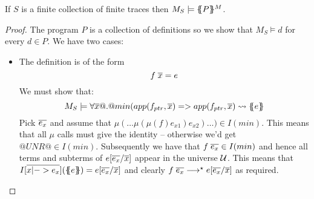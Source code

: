 \documentclass[preprint]{sigplanconf}
\begin{document}
\begin{theorem} If $S$ is a finite collection of finite traces then $M_S \models \{\!\!\{P\}\!\!\}^M$.
\end{theorem}
\begin{proof}
The program $P$ is a collection of definitions so we show that $M_S \models d$ for every $d \in P$. We have two
cases:
\begin{itemize}
  \item The definition is of the form 
                 \[ f\;\overline{x} = e \]
        We must show that:
        \[     M_S \models \forall \overline{x} @.@ min(app(f_{ptr},\overline{x}) => app(f_{ptr},\overline{x}) \rightsquigarrow \{\!\!\{{e}\}\!\!\} \]
        Pick $\overline{e_x}$ and assume that $\mu(\ldots\mu(\mu(f) e_{x1}) e_{x2})\ldots) \in I(min)$. This means that all
        $\mu$ calls must give the identity -- otherwise we'd get $@UNR@ \in I(min)$. Subsequently we have that
        $f\;\overline{e_x} \in I(min)$ and hence all terms and subterms of $e[\overline{e_x}/\overline{x}]$ appear in the universe
        ${\cal U}$. This
        means that $I[\overline{x |-> e_x}](\{\!\!\{{e}\}\!\!\}) = e[\overline{e_x}/\overline{x}]$ and clearly 
        $f\;\overline{e_x} \longrightarrow^{\star} e[\overline{e_x}/\overline{x}]$ as required.
        

\end{itemize}
\end{proof}
\end{document}
